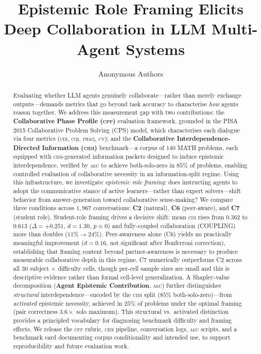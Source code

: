 \documentclass{article}
\title{Epistemic Role Framing Elicits Deep Collaboration in LLM Multi-Agent Systems}
\author{Anonymous Authors}
\newcommand{\CDI}{\textsc{cdi}}
\newcommand{\CQI}{\textsc{cqi}}
\newcommand{\PhAQ}{\textsc{phaq}}
\newcommand{\CY}{\textsc{cy}}
\newcommand{\CPP}{\textsc{cpp}}
\newcommand{\CIDI}{\textsc{cidi}}
\newcommand{\AEC}{\textsc{aec}}
\begin{document}
\maketitle

\begin{abstract}
Evaluating whether LLM agents genuinely collaborate---rather than merely
exchange outputs---demands metrics that go beyond task accuracy to
characterise \emph{how} agents reason together. We address this
measurement gap with two contributions: the \textbf{Collaborative Phase
Profile (\CPP)} evaluation framework, grounded in the PISA 2015
Collaborative Problem Solving (CPS) model, which characterises each
dialogue via four metrics (\CDI, \CQI, \PhAQ, \CY); and the
\textbf{Collaborative Interdependence-Directed Information (\CIDI)}
benchmark---a corpus of $140$ MATH problems, each equipped with
\CIDI-generated information packets designed to induce epistemic
interdependence, verified by \AEC{} to achieve both-solo-zero in
$85\%$ of problems, enabling controlled evaluation of collaborative
necessity in an information-split regime.
Using this infrastructure, we investigate \emph{epistemic role framing}:
does instructing agents to adopt the communicative stance of active
learners---rather than expert solvers---shift behavior from
answer-generation toward collaborative sense-making? We compare three
conditions across $1{,}967$ conversations: \textbf{C2} (natural),
\textbf{C6} (peer-aware), and \textbf{C7} (student role).
Student-role framing drives a decisive shift: mean \CDI{} rises from
$0.362$ to $0.613$ ($\Delta = +0.251$, $d = 1.30$, $p \approx 0$) and
fully-coupled collaboration (COUPLING) more than doubles ($11\% \to
24\%$). Peer-awareness alone (C6) yields no practically meaningful
improvement ($d = 0.16$, not significant after Bonferroni correction),
establishing that framing content beyond partner-awareness is necessary
to produce measurable collaborative depth in this regime. C7 numerically
outperforms C2 across all 30 subject $\times$ difficulty cells, though
per-cell sample sizes are small and this is descriptive evidence rather
than formal cell-level generalization.
A Shapley-value decomposition (\textbf{Agent Epistemic Contribution},
\AEC) further distinguishes \emph{structural} interdependence---encoded
by the \CIDI{} split ($85\%$ both-solo-zero)---from \emph{activated}
epistemic necessity, achieved in $25\%$ of problems under the optimal
framing (pair correctness $3.6\times$ solo maximum). This structural vs.\
activated distinction provides a principled vocabulary for diagnosing
benchmark difficulty and framing effects. We release the \CPP{} rubric, \CIDI{} pipeline, conversation logs,
\AEC{} scripts, and a benchmark card documenting corpus conditionality
and intended use, to support reproducibility and future evaluation work.
\end{abstract}
\end{document}
